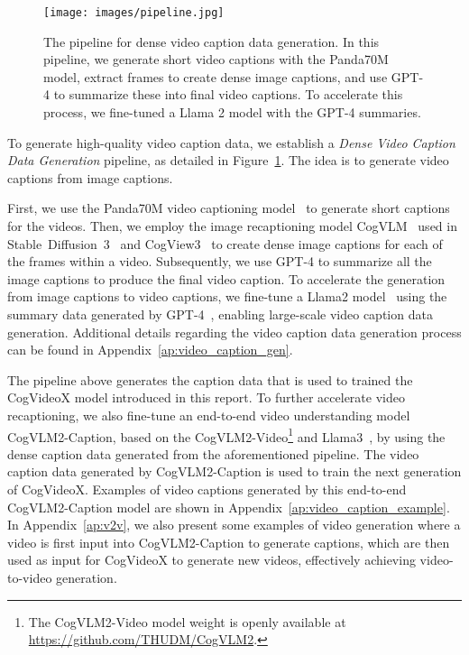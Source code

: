 \documentclass{article} \usepackage{iclr2024_conference,times}
\newcommand{\model}{CogVideoX\xspace}
\begin{document}
\begin{figure}[h]
\begin{center}
\texttt{[image: images/pipeline.jpg]}
\end{center}
\caption{The pipeline for dense video caption data generation. In this pipeline, we generate short video captions with the Panda70M model, extract frames to create dense image captions, and use GPT-4 to summarize these into final video captions. To accelerate this process, we fine-tuned a Llama 2 model with the GPT-4 summaries.}
\label{fig:video_caption_gen}
\end{figure} 
To generate high-quality video caption data, we establish a \textit{Dense Video Caption Data Generation} 
pipeline, as detailed in Figure~\ref{fig:video_caption_gen}.  
The idea is to generate video captions from image captions. 

First, we use the Panda70M video captioning model~\cite{chen2024panda} to generate short captions for the videos. 
Then, we employ the image recaptioning model CogVLM~\cite{wang2023cogvlm} used in Stable~Diffusion~3~\cite{esser2024scaling} and CogView3~\cite{zheng2024cogview3} to create dense image captions for each of the frames within a video.  
Subsequently, we use GPT-4 to summarize all the image captions to produce the final video caption. 
To accelerate the generation from image captions to video captions, we fine-tune a Llama2 model~\cite{touvron2023llama} using the summary data generated by GPT-4~\cite{GPT4}, enabling large-scale video caption data generation. Additional details regarding the video caption data generation process can be found in Appendix~\ref{ap:video_caption_gen}.




The pipeline above generates the caption data that is used to trained the \model model introduced in this report. 
To further accelerate video recaptioning, we also fine-tune an end-to-end video understanding model CogVLM2-Caption, based on the CogVLM2-Video\footnote{The CogVLM2-Video model weight is openly available at \url{https://github.com/THUDM/CogVLM2}.} and Llama3~\cite{llama3modelcard}, by using the dense caption data generated from the aforementioned pipeline. 
The video caption data generated by CogVLM2-Caption is used to train the next generation of \model. 
Examples of video captions generated by this end-to-end CogVLM2-Caption model are shown in Appendix~\ref{ap:video_caption_example}. 
In Appendix~\ref{ap:v2v}, we also present some examples of video generation where a video is first input into CogVLM2-Caption to generate captions, which are then used as input for \model to generate new videos, effectively achieving video-to-video generation.
\end{document}
